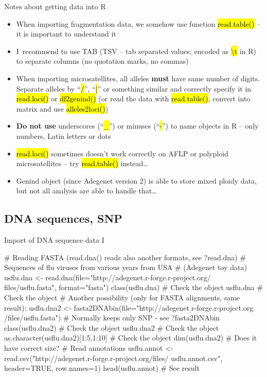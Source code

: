 \documentclass[compress, ucs, xelatex, 11pt, xcolor=svgnames,
  hyperref={
    bookmarks=true,
    unicode=true,
    colorlinks=true,
    pdftitle={Molecular data in R},
    plainpages=false,
    pdfauthor={Vojtech Zeisek},
    pdfsubject={Course about phylogeny and evolution in R},
    pdfcreator={XeLaTeX},
    pdfkeywords={R, evolution, phylogeny, molecular data},
    linkcolor=Tomato,
    anchorcolor=SaddleBrown,
    citecolor=Goldenrod,
    filecolor=DarkMagenta,
    menucolor=Sienna,
    urlcolor=DarkTurquoise,
    pdftex},
  url={hyphens, lowtilde} %
  ]{beamer}
\renewcommand{\texttt}[1]{\hl{\ttfamily #1}}
\begin{document}
\begin{frame}{Notes about getting data into R}
  \begin{itemize}
    \item When importing fragmentation data, we somehow use function \texttt{read.table()} -- it is important to understand it
    \item I~recommend to use TAB (TSV -- tab separated values; encoded as \texttt{\textbackslash t} in R) to separate columns (no quotation marks, no commas)
    \item When importing microsatellites, all alleles \textbf{must} have same number of digits. Separate alleles by ``\texttt{/}'', ``\texttt{|}'' or something similar and correctly specify it in \texttt{read.loci()} or \texttt{df2genind()} (or read the data with \texttt{read.table()}, convert into matrix and use \texttt{alleles2loci()})
    \item \textbf{Do not use} underscores (``\texttt{\_}'') or minuses (``\texttt{-}'') to name objects in R -- only numbers, Latin letters or dots
    \item \texttt{read.loci()} sometimes doesn't work correctly on AFLP or polyploid microsatellites -- try \texttt{read.table()} instead\ldots
    \item Genind object (since Adegenet version 2) is able to store mixed ploidy data, but not all analysis are able to handle that\ldots
  \end{itemize}
\end{frame}

\subsection{DNA sequences, SNP}

\begin{frame}[fragile]{Import of DNA sequence data I}
  \begin{spluscode}
    # Reading FASTA (read.dna() reads also another formats, see ?read.dna)
    # Sequences of flu viruses from various years from USA
    # (Adegenet toy data)
    usflu.dna <- read.dna(file="http://adegenet.r-forge.r-project.org/
      files/usflu.fasta", format="fasta")
    class(usflu.dna) # Check the object
    usflu.dna # Check the object
    # Another possibility (only for FASTA alignments, same result):
    usflu.dna2 <- fasta2DNAbin(file="http://adegenet.r-forge.r-project.org
      /files/usflu.fasta") # Normally keeps only SNP - see ?fasta2DNAbin
    class(usflu.dna2) # Check the object
    usflu.dna2 # Check the object
    as.character(usflu.dna2)[1:5,1:10] # Check the object
    dim(usflu.dna2) # Does it have correct size?
    # Read annotations
    usflu.annot <- read.csv("http://adegenet.r-forge.r-project.org/files/
      usflu.annot.csv", header=TRUE, row.names=1)
    head(usflu.annot) # See result
  \end{spluscode}
\end{frame}
\end{document}

